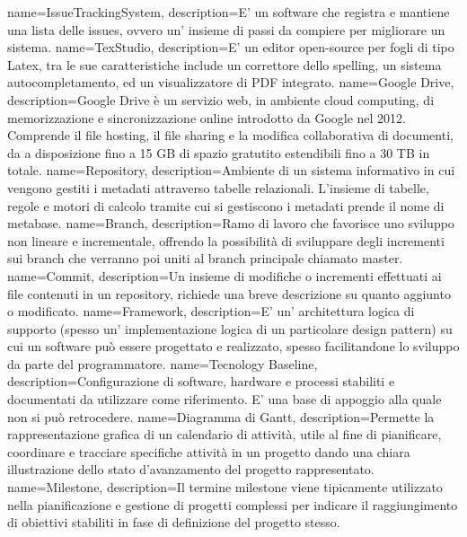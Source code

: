 {
    name=IssueTrackingSystem,
    description={E' un software che registra e mantiene una lista delle issues, ovvero un' insieme di passi da compiere per migliorare un sistema.}
}
{
    name=TexStudio,
    description={E' un editor open-source per fogli di tipo Latex, tra le sue caratteristiche include un correttore dello spelling, un sistema autocompletamento, ed un visualizzatore di PDF integrato. }
}
{
    name=Google Drive,
    description={Google Drive è un servizio web, in ambiente cloud computing, di memorizzazione e sincronizzazione online introdotto da Google nel 2012. Comprende il file hosting, il file sharing e la modifica collaborativa di documenti, da a disposizione fino a 15 GB di spazio gratutito estendibili fino a 30 TB in totale.}
}
{
    name=Repository,
    description={Ambiente di un sistema informativo in cui vengono  gestiti i metadati attraverso tabelle relazionali. L’insieme di tabelle, regole e motori di calcolo tramite cui si gestiscono i metadati prende il nome di metabase.}
}
{
    name=Branch,
    description={Ramo di lavoro che favorisce uno sviluppo non lineare e incrementale, offrendo la possibilità di sviluppare degli incrementi sui branch che verranno poi uniti al branch principale chiamato master.}
}
{
    name=Commit,
    description={Un insieme di modifiche o incrementi effettuati ai file contenuti in un repository, richiede una breve descrizione su quanto aggiunto o modificato.}
}
{
    name=Framework,
    description={E' un' architettura logica di supporto (spesso un' implementazione logica di un particolare design pattern) su cui un software può essere progettato e realizzato, spesso facilitandone lo sviluppo da parte del programmatore.}
}
{
    name=Tecnology Baseline,
    description={Configurazione di software, hardware e processi stabiliti e documentati da utilizzare come riferimento. E' una base di appoggio alla quale non si può retrocedere.}
}
{
    name=Diagramma di Gantt,
    description={Permette la rappresentazione grafica di un calendario di attività, utile al fine di pianificare, coordinare e tracciare specifiche attività in un progetto dando una chiara illustrazione dello stato d'avanzamento del progetto rappresentato.}
}
{
    name=Milestone,
    description={Il termine milestone viene tipicamente utilizzato nella pianificazione e gestione di progetti complessi per indicare il raggiungimento di obiettivi stabiliti in fase di definizione del progetto stesso.}
}


